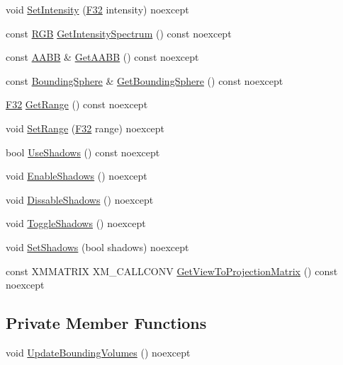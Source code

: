 \begin{DoxyCompactItemize}
\item 
void \hyperlink{classmage_1_1_omni_light_add3fece8f288f4d4b55357143faa490b}{Set\+Intensity} (\hyperlink{namespacemage_aa97e833b45f06d60a0a9c4fc22ae02c0}{F32} intensity) noexcept
\item 
const \hyperlink{structmage_1_1_r_g_b}{R\+GB} \hyperlink{classmage_1_1_omni_light_a89ce7086bd33e1d419dbd755316daf2e}{Get\+Intensity\+Spectrum} () const noexcept
\item 
const \hyperlink{classmage_1_1_a_a_b_b}{A\+A\+BB} \& \hyperlink{classmage_1_1_omni_light_a13fd21cba1f757156ceb6e2ba298ce07}{Get\+A\+A\+BB} () const noexcept
\item 
const \hyperlink{classmage_1_1_bounding_sphere}{Bounding\+Sphere} \& \hyperlink{classmage_1_1_omni_light_a01b221becfb2335366a235644c9f5faf}{Get\+Bounding\+Sphere} () const noexcept
\item 
\hyperlink{namespacemage_aa97e833b45f06d60a0a9c4fc22ae02c0}{F32} \hyperlink{classmage_1_1_omni_light_a1c829777c2afc850dd66382bc0115d8d}{Get\+Range} () const noexcept
\item 
void \hyperlink{classmage_1_1_omni_light_a696ec6a022ccc3993d88c1d435938fb1}{Set\+Range} (\hyperlink{namespacemage_aa97e833b45f06d60a0a9c4fc22ae02c0}{F32} range) noexcept
\item 
bool \hyperlink{classmage_1_1_omni_light_a8d58e7e1b26e54b3d9785ca79213cc4f}{Use\+Shadows} () const noexcept
\item 
void \hyperlink{classmage_1_1_omni_light_ad7c2e780dc83eb63fa44e1475492e192}{Enable\+Shadows} () noexcept
\item 
void \hyperlink{classmage_1_1_omni_light_a2353a53e336ffb55be9949ea6f1d8979}{Dissable\+Shadows} () noexcept
\item 
void \hyperlink{classmage_1_1_omni_light_a19164a13e884bce6fbc80b760c82d243}{Toggle\+Shadows} () noexcept
\item 
void \hyperlink{classmage_1_1_omni_light_a337082a4e6026fe6f98098df063e6660}{Set\+Shadows} (bool shadows) noexcept
\item 
const X\+M\+M\+A\+T\+R\+IX X\+M\+\_\+\+C\+A\+L\+L\+C\+O\+NV \hyperlink{classmage_1_1_omni_light_abae044c80634cfc6d15a0e21e7a55b5d}{Get\+View\+To\+Projection\+Matrix} () const noexcept
\end{DoxyCompactItemize}
\subsection*{Private Member Functions}
\begin{DoxyCompactItemize}
\item 
void \hyperlink{classmage_1_1_omni_light_a6a10cdc0ed276d68e5378eaf934158e1}{Update\+Bounding\+Volumes} () noexcept
\end{DoxyCompactItemize}

